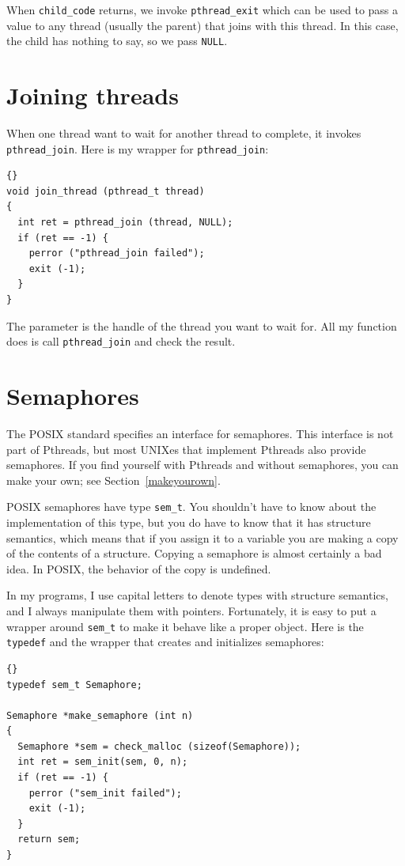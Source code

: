 \documentclass{book}
\begin{document}
When {\tt child\_code} returns, we invoke {\tt pthread\_exit}
which can be used to pass a value to any thread (usually the
parent) that joins with this thread.  In this case, the child
has nothing to say, so we pass {\tt NULL}.


\section{Joining threads}

When one thread want to wait for another thread to complete,
it invokes {\tt pthread\_join}.
Here is my wrapper for {\tt pthread\_join}:

\begin{latin}
\begin{lstlisting}[title={}]{}
void join_thread (pthread_t thread)
{
  int ret = pthread_join (thread, NULL);
  if (ret == -1) {
    perror ("pthread_join failed");
    exit (-1);
  }
}
\end{lstlisting}
\end{latin}

The parameter is the handle of the thread you want to wait for.
All my function does is call {\tt pthread\_join} and check the
result.


\section{Semaphores}

The POSIX standard specifies an interface for semaphores.
This interface is not part of Pthreads, but most UNIXes
that implement Pthreads also provide semaphores.  If you
find yourself with Pthreads and without semaphores, you
can make your own; see Section~\ref{makeyourown}.

POSIX semaphores have type {\tt sem\_t}.  You shouldn't have
to know about the implementation of this type, but you do
have to know that it has structure semantics, which means that
if you assign it to a variable you are making a copy of the
contents of a structure.  Copying a semaphore is almost certainly
a bad idea.  In POSIX, the behavior of the copy is undefined.

In my programs, I use capital letters to denote types with
structure semantics, and I always manipulate them with pointers.
Fortunately, it is easy to put a wrapper around {\tt sem\_t}
to make it behave like a proper object.  Here is the 
{\tt typedef} and the wrapper that creates and initializes
semaphores:

\begin{latin}
\begin{lstlisting}[title={}]{}
typedef sem_t Semaphore;

Semaphore *make_semaphore (int n)
{
  Semaphore *sem = check_malloc (sizeof(Semaphore));
  int ret = sem_init(sem, 0, n);
  if (ret == -1) {
    perror ("sem_init failed");
    exit (-1);    
  }
  return sem;
}
\end{lstlisting}
\end{latin}
\end{document}
